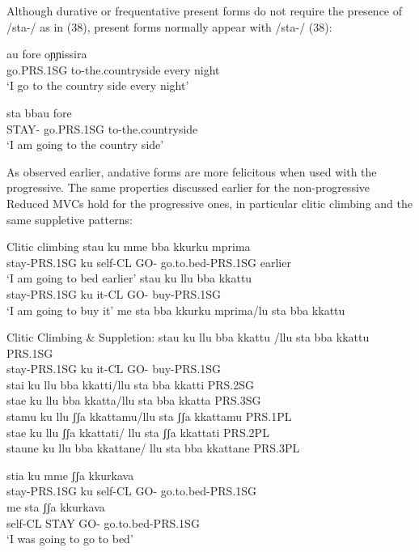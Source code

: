 \documentclass[output=paper,colorlinks,citecolor=brown,
]{langscibook}
\begin{document}
Although durative or frequentative present forms do not require the presence of /sta-/ as in (38), present forms normally appear with /sta-/ (38):

\ea \gll  au        fore         oɲɲissira\\
   go.PRS.1SG  to-the.countryside every night\\
 \glt  ‘I go to the country side every night’
\z

\ea \gll sta    bbau       fore\\
   STAY- go.PRS.1SG  to-the.countryside \\
\glt   ‘I am going to the country side’
\z

As observed earlier, andative forms are more felicitous when used with the progressive. The same properties discussed earlier for the non-progressive Reduced MVCs hold for the progressive ones, in particular clitic climbing and the same suppletive patterns:

\ea Clitic climbing 
    \ea
        \ea \gll stau       ku  mme   bba  kkurku      mprima\\
      stay-PRS.1SG ku self-CL  GO- go.to.bed-PRS.1SG earlier\\
      \glt ‘I am going to bed earlier’
        \ex \gll stau       ku   llu   bba   kkattu\\
      stay-PRS.1SG  ku   it-CL  GO-  buy-PRS.1SG\\
      \glt ‘I am going to buy it’
        \z
    \ex me sta bba kkurku mprima/lu sta bba kkattu
    \z
\z

\ea Clitic Climbing \& Suppletion:
    \ea \gll stau    ku     llu   bba  kkattu /llu sta bba kkattu \hfill PRS.1SG\\
    stay-PRS.1SG ku  it-CL  GO-  buy-PRS.1SG\\
    \glt stai ku llu bba kkatti/llu sta bba kkatti  \hfill     PRS.2SG\\
    stae ku llu bba kkatta/llu sta bba kkatta   \hfill    PRS.3SG\\
    stamu ku llu ʃʃa kkattamu/llu sta ʃʃa kkattamu \hfill  PRS.1PL\\
    stae ku llu ʃʃa kkattati/ llu sta ʃʃa kkattati  \hfill    PRS.2PL\\
    staune ku llu bba kkattane/ llu sta bba kkattane \hfill PRS.3PL\\
    \z
\z

\ea
    \ea \gll stia       ku mme   ʃʃa   kkurkava \\
    stay-PRS.1SG ku self-CL  GO- go.to.bed-PRS.1SG\\
    \ex \gll me    sta    ʃʃa   kkurkava\\
    self-CL STAY GO- go.to.bed-PRS.1SG\\
    \glt ‘I was going to go to bed’
    \z
\z
\end{document}
